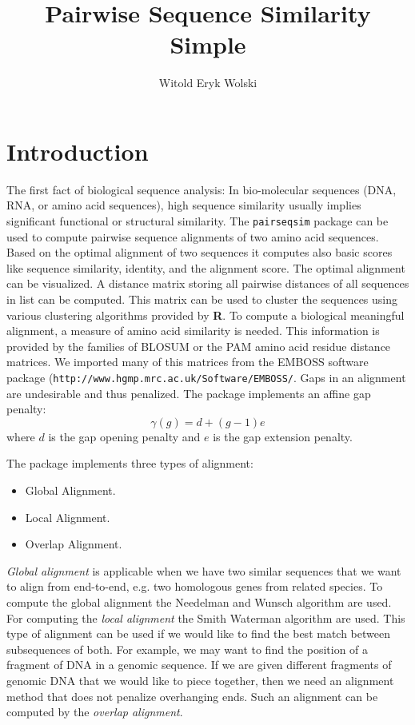 \documentclass{article}
\title{Pairwise Sequence Similarity Simple}
\author{Witold Eryk Wolski}
\begin{document}
\maketitle
{}

\section{Introduction}

The first fact of biological sequence analysis: In bio-molecular sequences (DNA, RNA, or amino acid sequences), high sequence similarity usually implies significant functional or structural similarity. The \texttt{pairseqsim} package can be used to compute pairwise sequence alignments of two amino acid sequences. Based on the optimal alignment of two sequences it computes also basic scores like sequence similarity, identity, and the alignment score. The optimal alignment can be visualized. A distance matrix storing all pairwise distances of all sequences in list can be computed. This matrix can be used to cluster the sequences using various clustering algorithms provided by {\bf R}. 
To compute a biological meaningful alignment, a measure of amino acid similarity is needed. This information is provided by the families of BLOSUM or the PAM amino acid residue distance matrices. We imported many of this matrices from the EMBOSS software package (\texttt{http://www.hgmp.mrc.ac.uk/Software/EMBOSS/}. Gaps in an alignment are undesirable and thus penalized. The package implements an affine gap penalty:
\begin{equation}
\gamma(g)=d+(g-1)e
\end{equation}
where $d$ is the gap opening penalty and $e$ is the gap extension penalty.

The package implements three types of alignment:
\begin{itemize}
\item Global Alignment.
\item Local Alignment.
\item Overlap Alignment.
\end{itemize}

\emph{Global alignment} is applicable when we have two similar sequences that we want to align from end-to-end, e.g. two homologous genes from related species. To compute the global alignment the Needelman and Wunsch algorithm are used. For computing the \emph{local alignment} the Smith Waterman algorithm are used.  This type of alignment can be used if we would like to find the best match between subsequences of both. For example, we may want to find the position of a fragment of DNA in a genomic sequence. If we are given different fragments of genomic DNA that we would like to piece together, then we need an alignment method that does not penalize overhanging ends. Such an alignment can be computed by the \emph{overlap alignment}.
\end{document}
